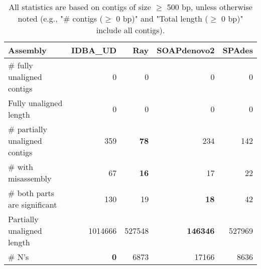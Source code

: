 \documentclass[12pt,a4paper]{article}
\begin{document}
\begin{table}[ht]
\begin{center}
\caption{All statistics are based on contigs of size $\geq$ 500 bp, unless otherwise noted (e.g., "\# contigs ($\geq$ 0 bp)" and "Total length ($\geq$ 0 bp)" include all contigs).}
\begin{tabular}{|l*{4}{|r}|}
\hline
Assembly & IDBA\_UD & Ray & SOAPdenovo2 & SPAdes \\ \hline
\# fully unaligned contigs & 0 & 0 & 0 & 0 \\ \hline
Fully unaligned length & 0 & 0 & 0 & 0 \\ \hline
\# partially unaligned contigs & 359 & {\bf 78} & 234 & 142 \\ \hline
\hspace{5mm}\# with misassembly & 67 & {\bf 16} & 17 & 22 \\ \hline
\hspace{5mm}\# both parts are significant & 130 & 19 & {\bf 18} & 42 \\ \hline
Partially unaligned length & 1014666 & 527548 & {\bf 146346} & 527969 \\ \hline
\# N's & {\bf 0} & 6873 & 17166 & 8636 \\ \hline
\end{tabular}
\end{center}
\end{table}
\end{document}
